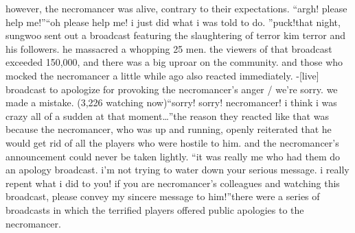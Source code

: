 however, the necromancer was alive, contrary to their expectations.
“argh! please help me!”“oh please help me! i just did what i was told to do.
”puck!that night, sungwoo sent out a broadcast featuring the slaughtering of terror kim terror and his followers.
 he massacred a whopping 25 men.
the viewers of that broadcast exceeded 150,000, and there was a big uproar on the community.
and those who mocked the necromancer a little while ago also reacted immediately.
-[live] broadcast to apologize for provoking the necromancer’s anger / we’re sorry.
 we made a mistake.
 (3,226 watching now)“sorry! sorry! necromancer! i think i was crazy all of a sudden at that moment…”the reason they reacted like that was because the necromancer, who was up and running, openly reiterated that he would get rid of all the players who were hostile to him.
and the necromancer’s announcement could never be taken lightly.
“it was really me who had them do an apology broadcast.
 i’m not trying to water down your serious message.
 i really repent what i did to you! if you are necromancer’s colleagues and watching this broadcast, please convey my sincere message to him!”there were a series of broadcasts in which the terrified players offered public apologies to the necromancer.

